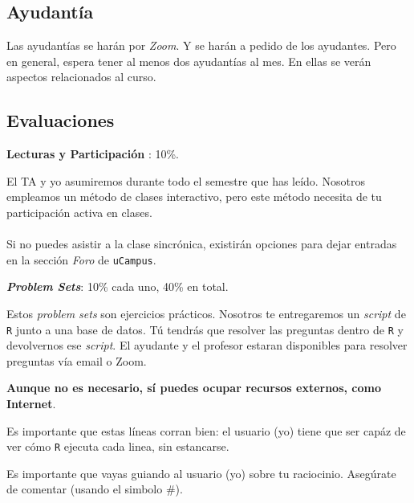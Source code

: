 \documentclass[letterpaper]{article}
\renewenvironment{itemize}{
  \begin{list}{}{
    \setlength{\leftmargin}{1.5em}
  }
}{
  \end{list}
}
\begin{document}
\subsection*{Ayudant\'ia}

Las ayudant\'ias se har\'an por \emph{Zoom}. Y se har\'an a pedido de los ayudantes. Pero en general, espera tener al menos dos ayudant\'ias al mes. En ellas se ver\'an aspectos relacionados al curso.



\subsection*{Evaluaciones}

\begin{enumerate}

	\item {\bf Lecturas y Participaci\'on }: 10\%.
	
    El TA y yo asumiremos durante todo el semestre que has le\'ido. Nosotros empleamos un m\'etodo de clases interactivo, pero este m\'etodo necesita de tu participaci\'on activa en clases.
    \\
    \\  
    Si no puedes asistir a la clase sincr\'onica, existir\'an opciones para dejar entradas en la secci\'on \emph{Foro} de \texttt{uCampus}.

	\item {\bf \emph{Problem Sets}}: 10\% cada uno, 40\% en total.

Estos \emph{problem sets} son ejercicios pr\'acticos. Nosotros te entregaremos un \emph{script} de \texttt{R} junto a una base de datos. T\'u tendr\'as que resolver las preguntas dentro de \texttt{R} y devolvernos ese \emph{script}. El ayudante y el profesor estaran disponibles para resolver preguntas v\'ia email o Zoom.

\begin{itemize}
		\item[$\diamond$] {\bf Aunque no es necesario, s\'i puedes ocupar recursos externos, como Internet}.
		\item[$\diamond$] Es importante que estas l\'ineas corran bien: el usuario (yo) tiene que ser cap\'az de ver c\'omo \texttt{R} ejecuta cada linea, sin estancarse.
		\item[$\diamond$] Es importante que vayas guiando al usuario (yo) sobre tu raciocinio. Aseg\'urate de comentar (usando el simbolo \#).
\end{itemize}



\end{enumerate}
\end{document}
